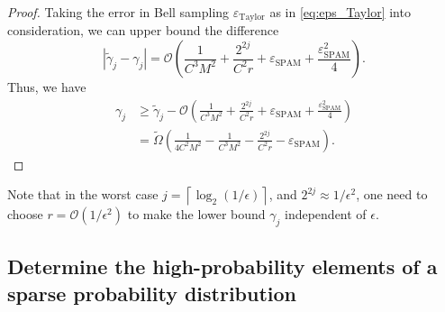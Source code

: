 \documentclass[twocolumn,superscriptaddress,aps,showpacs,amsmath,amstex,amssymb,citeautoscript,floatfix,pra,preprintnumbers]{revtex4-2}
\theoremstyle{plain}
\theoremstyle{plain}
\theoremstyle{plain}
\theoremstyle{plain}
\theoremstyle{plain}
\theoremstyle{plain}
\begin{document}
\begin{appendix}
\begin{proof}
Taking the error in Bell sampling $\varepsilon_{\text{Taylor}}$ as in \eqref{eq:eps_Taylor} into consideration, we can upper bound the difference
\begin{equation}
    |\tilde{\gamma}_j-\gamma_j| = \mathcal{O}\left(\frac{1}{C^3M^2}+\frac{2^{2j}}{C^2r}+\varepsilon_{\text{SPAM}}+\frac{\varepsilon_{\text{SPAM}}^2}{4}\right).
\end{equation}
Thus, we have
\begin{equation}
    \begin{split}
        \gamma_j &\geq \tilde{\gamma}_j - \mathcal{O}\left(\frac{1}{C^3M^2}+\frac{2^{2j}}{C^2r}+\varepsilon_{\text{SPAM}}+\frac{\varepsilon_{\text{SPAM}}^2}{4}\right)\\
        &= \widetilde{\Omega}\left(\frac{1}{4C^2M^2}-\frac{1}{C^3M^2}-\frac{2^{2j}}{C^2r}-\varepsilon_{\text{SPAM}}\right).
    \end{split}
\end{equation}
\end{proof}

Note that in the worst case $j=\left\lceil\log_2(1/\epsilon)\right\rceil$, and $2^{2j}\approx 1/\epsilon^2$, one need to choose $r = \mathcal{O}(1/\epsilon^2)$ to make the lower bound $\gamma_j$ independent of $\epsilon$.


\subsection{Determine the high-probability elements of a sparse probability distribution\label{sec:high_prob_detection}}


\end{appendix}
\end{document}
